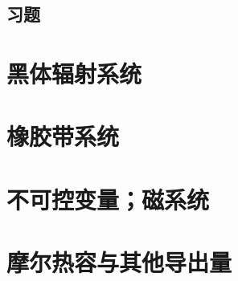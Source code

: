 \subsection*{习题}

\section{黑体辐射系统}
\label{sec3.6}

\section{橡胶带系统}
\label{sec3.7}

\section{不可控变量；磁系统}
\label{sec3.8}

\section{摩尔热容与其他导出量}
\label{sec3.9}
